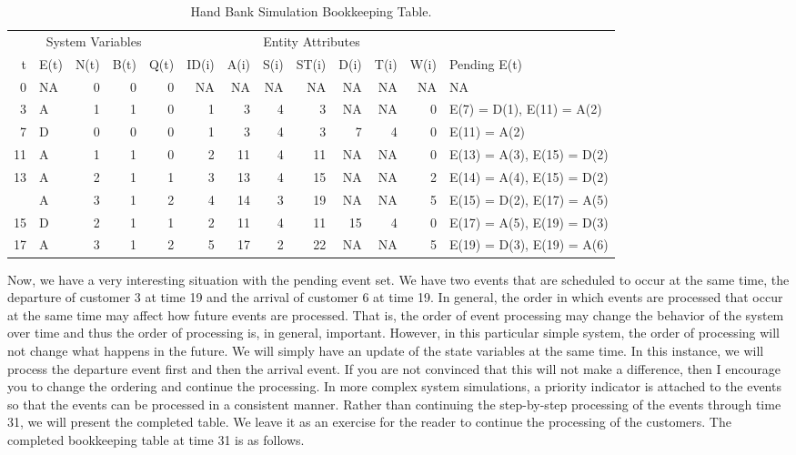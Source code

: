 \documentclass[
]{book}
\theoremstyle{definition}
\theoremstyle{definition}
\theoremstyle{definition}
\theoremstyle{definition}
\theoremstyle{remark}
\begin{document}
\begin{table}

\caption{\label{tab:SQBH8}Hand Bank Simulation Bookkeeping Table.}
\centering
\fontsize{10}{12}\selectfont
\begin{tabular}[t]{rlrrrrrrrrrrl}
\toprule
\multicolumn{5}{c}{System Variables} & \multicolumn{7}{c}{Entity Attributes} & \multicolumn{1}{c}{ } \\
\cmidrule(l{3pt}r{3pt}){1-5} \cmidrule(l{3pt}r{3pt}){6-12}
t & E(t) & N(t) & B(t) & Q(t) & ID(i) & A(i) & S(i) & ST(i) & D(i) & T(i) & W(i) & Pending E(t)\\
\midrule
0 & NA & 0 & 0 & 0 & NA & NA & NA & NA & NA & NA & NA & NA\\
3 & A & 1 & 1 & 0 & 1 & 3 & 4 & 3 & NA & NA & 0 & E(7) = D(1), E(11) = A(2)\\
7 & D & 0 & 0 & 0 & 1 & 3 & 4 & 3 & 7 & 4 & 0 & E(11) = A(2)\\
11 & A & 1 & 1 & 0 & 2 & 11 & 4 & 11 & NA & NA & 0 & E(13) = A(3), E(15) = D(2)\\
13 & A & 2 & 1 & 1 & 3 & 13 & 4 & 15 & NA & NA & 2 & E(14) = A(4), E(15) = D(2)\\
\addlinespace
14 & A & 3 & 1 & 2 & 4 & 14 & 3 & 19 & NA & NA & 5 & E(15) = D(2), E(17) = A(5)\\
15 & D & 2 & 1 & 1 & 2 & 11 & 4 & 11 & 15 & 4 & 0 & E(17) = A(5), E(19) = D(3)\\
17 & A & 3 & 1 & 2 & 5 & 17 & 2 & 22 & NA & NA & 5 & E(19) = D(3), E(19) = A(6)\\
\bottomrule
\end{tabular}
\end{table}

Now, we have a very interesting situation with the pending event set. We
have two events that are scheduled to occur at the same time, the
departure of customer 3 at time 19 and the arrival of customer 6 at time
19. In general, the order in which events are processed that occur at
the same time may affect how future events are processed. That is, the
order of event processing may change the behavior of the system over
time and thus the order of processing is, in general, important.
However, in this particular simple system, the order of processing will
not change what happens in the future. We will simply have an update of
the state variables at the same time. In this instance, we will process
the departure event first and then the arrival event. If you are not
convinced that this will not make a difference, then I encourage you to
change the ordering and continue the processing. In more complex system
simulations, a priority indicator is attached to the events so that the
events can be processed in a consistent manner. Rather than continuing
the step-by-step processing of the events through time 31, we will
present the completed table. We leave it as an exercise for the reader
to continue the processing of the customers. The completed bookkeeping table at
time 31 is as follows.
\end{document}
